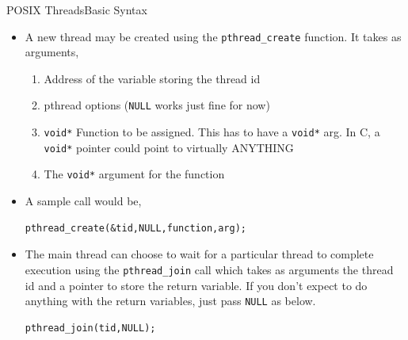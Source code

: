 \documentclass{beamer}
\begin{document}
\begin{frame}[fragile]{POSIX Threads}{Basic Syntax}
  \begin{itemize}
    \item A new thread may be created using the \verb|pthread_create|
      function. It takes as arguments,
      \begin{enumerate}
        \item Address of the variable storing the thread id
        \item pthread options (\verb|NULL| works just fine for
          now) 
        \item \verb|void*| Function to be assigned. This has to have a
          \verb|void*| arg. In C, a \verb|void*| pointer could point
          to virtually ANYTHING
        \item The \verb|void*| argument for the function
      \end{enumerate}
    \item A sample call would be,
\begin{verbatim}
pthread_create(&tid,NULL,function,arg);
\end{verbatim}
    \item The main thread can choose to wait for a particular thread
      to complete execution using the \verb|pthread_join| call which
      takes as arguments the thread id and a pointer to store the
      return variable. If you don't expect to do anything with the
      return variables, just pass \verb|NULL| as below.
\begin{verbatim}
pthread_join(tid,NULL);
\end{verbatim}
  \end{itemize}
\end{frame}
\end{document}
